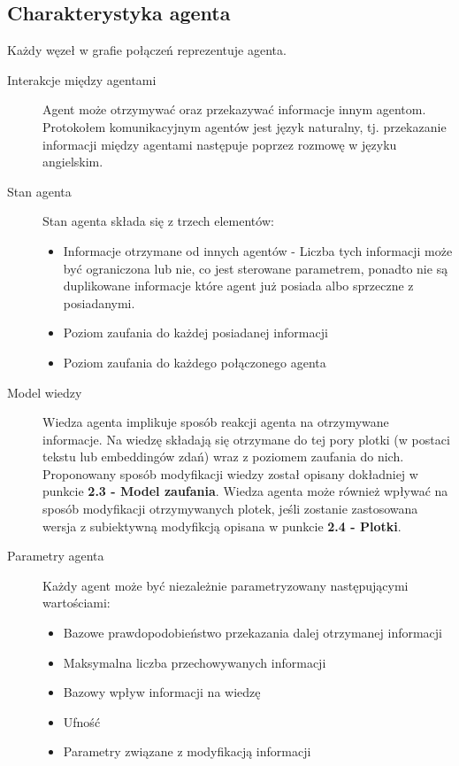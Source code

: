 \documentclass{article}
\begin{document}
	\subsection{Charakterystyka agenta}
	Każdy węzeł w grafie połączeń reprezentuje agenta.
	\begin{description}
		\item[Interakcje między agentami]
		Agent może otrzymywać oraz przekazywać informacje innym agentom.
		Protokołem komunikacyjnym agentów jest język naturalny, tj.
		przekazanie informacji między agentami następuje poprzez rozmowę
w języku angielskim.
		\item[Stan agenta]
		Stan agenta składa się z trzech elementów:
		\begin{itemize}
			\item {Informacje otrzymane od innych agentów - 
			Liczba tych informacji może być ograniczona lub nie, co jest sterowane parametrem,
			ponadto nie są duplikowane informacje które agent już posiada albo sprzeczne z posiadanymi.}
			\item {Poziom zaufania do każdej posiadanej informacji}
			\item {Poziom zaufania do każdego połączonego agenta}
		\end{itemize}	
		\item[Model wiedzy]
		Wiedza agenta implikuje sposób reakcji agenta na otrzymywane informacje. Na wiedzę składają się otrzymane do tej pory plotki (w postaci tekstu lub embeddingów zdań) wraz z poziomem zaufania do nich. Proponowany sposób modyfikacji wiedzy został opisany dokładniej w punkcie \textbf{2.3 - Model zaufania}. Wiedza agenta może również wpływać na sposób modyfikacji otrzymywanych plotek, jeśli zostanie zastosowana wersja z subiektywną modyfikcją opisana w punkcie \textbf{2.4 - Plotki}.
		\item[Parametry agenta] Każdy agent może być niezależnie parametryzowany następującymi wartościami:
		\begin{itemize}
			\item{Bazowe prawdopodobieństwo przekazania dalej otrzymanej informacji}
			\item{Maksymalna liczba przechowywanych informacji}
			\item{Bazowy wpływ informacji na wiedzę}
			\item{Ufność}
			\item{Parametry związane z modyfikacją informacji}
		\end{itemize}
	\end{description}
\end{document}

